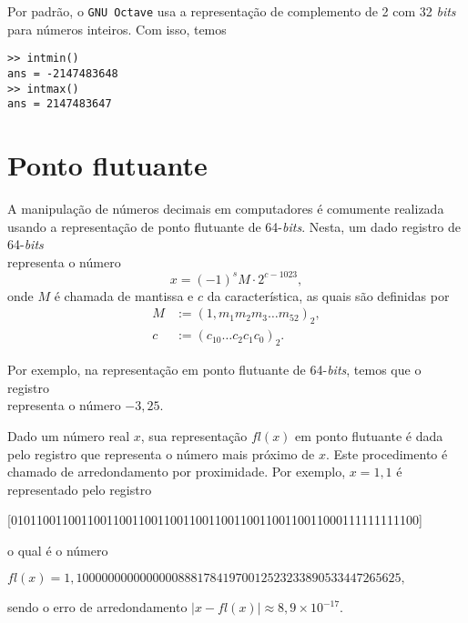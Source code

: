 \ifisoctave
\begin{obs}
  Por padrão, o \verb+GNU Octave+ usa a representação de complemento de 2 com 32 {\it bits} para números inteiros. Com isso, temos
\begin{verbatim}
>> intmin()
ans = -2147483648
>> intmax()
ans = 2147483647
\end{verbatim}
\end{obs}
\fi

\section{Ponto flutuante}\label{cap_aritm_sec_ptoflutuante}

A manipulação de números decimais em computadores é comumente realizada usando a representação de ponto flutuante de 64-{\it bits}. Nesta, um dado registro de 64-{\it bits}
\begin{equation}
  [m_{52} ~ m_{51} ~ m_{50} ~ \cdots ~ m_{1} ~ | ~ c_0 ~ c_1 ~ c_2 ~ \cdots ~ c_{10} ~ | ~ s]
\end{equation}
representa o número
\begin{equation}
  x = (-1)^s M\cdot 2^{c - 1023},
\end{equation}
onde $M$ é chamada de mantissa e $c$ da característica, as quais são definidas por
\begin{align}
  M &:= (1,m_1m_2m_3\ldots m_{52})_2,\\
  c &:= (c_{10}\ldots c_2c_1c_0)_2.
\end{align}

\begin{ex}
  Por exemplo, na representação em ponto flutuante de 64-{\it bits}, temos que o registro
  \begin{equation}
    [0 ~ 0 ~ 0 ~ \cdots ~ 0 ~ 1 ~ 0 ~ 1 ~ | ~ 0 ~ 0 ~ 0 ~ \cdots ~ 0 ~ 1 ~ | ~ 1]
  \end{equation}
representa o número $-3,25$.
\end{ex}

Dado um número real $x$, sua representação $fl(x)$ em ponto flutuante é dada pelo registro que representa o número mais próximo de $x$. Este procedimento é chamado de arredondamento por proximidade. Por exemplo, $x = 1,1$ é representado pelo registro
\begin{small}
  \begin{center}
    [0101100110011001100110011001100110011001100110011000111111111100]
  \end{center}
\end{small}
o qual é o número 
\begin{small}
  \begin{center}
    $fl(x) = 1,100000000000000088817841970012523233890533447265625,$
  \end{center}
\end{small}
sendo o erro de arredondamento $|x - fl(x)| \approx 8,9\times 10^{-17}$.

